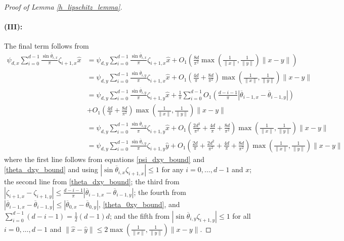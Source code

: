 \documentclass[11pt]{article}
\theoremstyle{remark}
\begin{document}
\begin{proof}[Proof of Lemma \ref{h_lipschitz_lemma}]
\paragraph{(III):} The final term follows from \begin{align*}
    \psi_{d,x}\sum_{i=0}^{d-1}\frac{\sin \overline{\theta}_{i,x}}{\pi}\zeta_{i+1,x}\hat{x} & = \psi_{d,y}\sum_{i=0}^{d-1}\frac{\sin \overline{\theta}_{i,x}}{\pi}\zeta_{i+1,x}\hat{x} + O_1\left(\frac{8d}{\pi^2}\max\left(\frac{1}{\|x\|},\frac{1}{\|y\|}\right)\|x-y\|\right) \\
    & = \psi_{d,y}\sum_{i=0}^{d-1}\frac{\sin \overline{\theta}_{i,y}}{\pi}\zeta_{i+1,x}\hat{x} + O_1\left(\frac{4d}{\pi}+\frac{8d}{\pi^2}\right)\max\left(\frac{1}{\|x\|},\frac{1}{\|y\|}\right)\|x-y\| \\
     & = \psi_{d,y}\sum_{i=0}^{d-1}\frac{\sin \overline{\theta}_{i,y}}{\pi}\zeta_{i+1,y}\hat{x}  + \frac{1}{\pi}\sum_{i=0}^{d-1}O_1\left(\frac{d-i-1}{\pi}|\overline{\theta}_{i-1,x}-\overline{\theta}_{i-1,y}|\right)\\
     & + O_1\left(\frac{4d}{\pi}+\frac{8d}{\pi^2}\right)\max\left(\frac{1}{\|x\|},\frac{1}{\|y\|}\right)\|x-y\| \\
    & = \psi_{d,y}\sum_{i=0}^{d-1}\frac{\sin \overline{\theta}_{i,y}}{\pi}\zeta_{i+1,y}\hat{x} + O_1\left(\frac{2d^2}{\pi^2}+\frac{4d}{\pi}+\frac{8d}{\pi^2}\right)\max\left(\frac{1}{\|x\|},\frac{1}{\|y\|}\right)\|x-y\| \\
    & =\psi_{d,y}\sum_{i=0}^{d-1}\frac{\sin \overline{\theta}_{i,y}}{\pi}\zeta_{i+1,y}\hat{y} + O_1\left(\frac{2d}{\pi}+\frac{2d^2}{\pi^2}+\frac{4d}{\pi}+\frac{8d}{\pi^2}\right)\max\left(\frac{1}{\|x\|},\frac{1}{\|y\|}\right)\|x-y\| 
\end{align*} where the first line follows from equations \eqref{psi_dxy_bound} and \eqref{theta_dxy_bound} and using $|\sin \overline{\theta}_{i,x} \zeta_{i+1,x}| \leqslant 1$ for any $i = 0,\dots,d-1$ and $x$; the second line from \eqref{theta_dxy_bound}; the third from $|\zeta_{i+1,x}-\zeta_{i+1,y}|\leqslant \frac{d-i-1}{\pi}|\overline{\theta}_{i-1,x}-\overline{\theta}_{i-1,y}|$; the fourth from $|\overline{\theta}_{i-1,x}-\overline{\theta}_{i-1,y}|\leqslant |\overline{\theta}_{0,x}-\overline{\theta}_{0,y}|$, \eqref{theta_0xy_bound}, and $\sum_{i=0}^{d-1}(d-i-1)=\frac{1}{2}(d-1)d$; and the fifth from $|\sin \overline{\theta}_{i,y}\zeta_{i+1,y}|\leqslant 1$ for all $i = 0,\dots,d-1$ and $\|\hat{x}-\hat{y}\|\leqslant 2\max\left(\frac{1}{\|x\|},\frac{1}{\|y\|}\right)\|x-y\|$.%

\end{proof}
\end{document}
